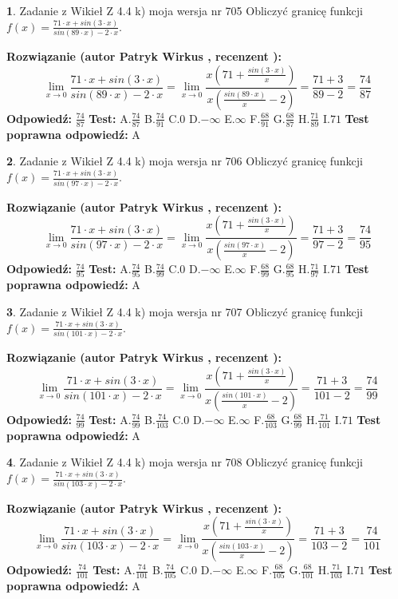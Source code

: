 \documentclass[12pt, a4paper]{article}
\theoremstyle{definition} %
\newtheorem{zad}{}
\newcommand{\zadStart}[1]{\begin{zad}#1\newline}
\newcommand{\zadStop}{\end{zad}}
\newcommand{\rozwStart}[2]{\noindent \textbf{Rozwiązanie (autor #1 , recenzent #2): }\newline}
\newcommand{\rozwStop}{\newline}
\newcommand{\odpStart}{\noindent \textbf{Odpowiedź:}\newline}
\newcommand{\odpStop}{\newline}
\newcommand{\testStart}{\noindent \textbf{Test:}\newline}
\newcommand{\testStop}{\newline}
\newcommand{\kluczStart}{\noindent \textbf{Test poprawna odpowiedź:}\newline}
\newcommand{\kluczStop}{\newline}
\begin{document}
\zadStart{Zadanie z Wikieł Z 4.4 k) moja wersja nr 705}
Obliczyć granicę funkcji $f(x)=\frac{71\cdot x +sin(3\cdot x)}{sin(89\cdot x) -2\cdot x}$.
\zadStop
\rozwStart{Patryk Wirkus}{}
$$\lim\limits_{x\to 0}\frac{71\cdot x +sin(3\cdot x)}{sin(89\cdot x) -2\cdot x}
=\lim\limits_{x\to 0}\frac{x(71+\frac{sin(3\cdot x)}{x})}{x(\frac{sin(89\cdot x)}{x}-2)}
=\frac{71+3}{89-2} = \frac{74}{87}$$
\rozwStop
\odpStart
$\frac{74}{87}$
\odpStop
\testStart
A.$\frac{74}{87}$
B.$\frac{74}{91}$
C.$0$
D.$-\infty$
E.$\infty$
F.$\frac{68}{91}$
G.$\frac{68}{87}$
H.$\frac{71}{89}$
I.$71$
\testStop
\kluczStart
A
\kluczStop



\zadStart{Zadanie z Wikieł Z 4.4 k) moja wersja nr 706}
Obliczyć granicę funkcji $f(x)=\frac{71\cdot x +sin(3\cdot x)}{sin(97\cdot x) -2\cdot x}$.
\zadStop
\rozwStart{Patryk Wirkus}{}
$$\lim\limits_{x\to 0}\frac{71\cdot x +sin(3\cdot x)}{sin(97\cdot x) -2\cdot x}
=\lim\limits_{x\to 0}\frac{x(71+\frac{sin(3\cdot x)}{x})}{x(\frac{sin(97\cdot x)}{x}-2)}
=\frac{71+3}{97-2} = \frac{74}{95}$$
\rozwStop
\odpStart
$\frac{74}{95}$
\odpStop
\testStart
A.$\frac{74}{95}$
B.$\frac{74}{99}$
C.$0$
D.$-\infty$
E.$\infty$
F.$\frac{68}{99}$
G.$\frac{68}{95}$
H.$\frac{71}{97}$
I.$71$
\testStop
\kluczStart
A
\kluczStop



\zadStart{Zadanie z Wikieł Z 4.4 k) moja wersja nr 707}
Obliczyć granicę funkcji $f(x)=\frac{71\cdot x +sin(3\cdot x)}{sin(101\cdot x) -2\cdot x}$.
\zadStop
\rozwStart{Patryk Wirkus}{}
$$\lim\limits_{x\to 0}\frac{71\cdot x +sin(3\cdot x)}{sin(101\cdot x) -2\cdot x}
=\lim\limits_{x\to 0}\frac{x(71+\frac{sin(3\cdot x)}{x})}{x(\frac{sin(101\cdot x)}{x}-2)}
=\frac{71+3}{101-2} = \frac{74}{99}$$
\rozwStop
\odpStart
$\frac{74}{99}$
\odpStop
\testStart
A.$\frac{74}{99}$
B.$\frac{74}{103}$
C.$0$
D.$-\infty$
E.$\infty$
F.$\frac{68}{103}$
G.$\frac{68}{99}$
H.$\frac{71}{101}$
I.$71$
\testStop
\kluczStart
A
\kluczStop



\zadStart{Zadanie z Wikieł Z 4.4 k) moja wersja nr 708}
Obliczyć granicę funkcji $f(x)=\frac{71\cdot x +sin(3\cdot x)}{sin(103\cdot x) -2\cdot x}$.
\zadStop
\rozwStart{Patryk Wirkus}{}
$$\lim\limits_{x\to 0}\frac{71\cdot x +sin(3\cdot x)}{sin(103\cdot x) -2\cdot x}
=\lim\limits_{x\to 0}\frac{x(71+\frac{sin(3\cdot x)}{x})}{x(\frac{sin(103\cdot x)}{x}-2)}
=\frac{71+3}{103-2} = \frac{74}{101}$$
\rozwStop
\odpStart
$\frac{74}{101}$
\odpStop
\testStart
A.$\frac{74}{101}$
B.$\frac{74}{105}$
C.$0$
D.$-\infty$
E.$\infty$
F.$\frac{68}{105}$
G.$\frac{68}{101}$
H.$\frac{71}{103}$
I.$71$
\testStop
\kluczStart
A
\kluczStop
\end{document}
